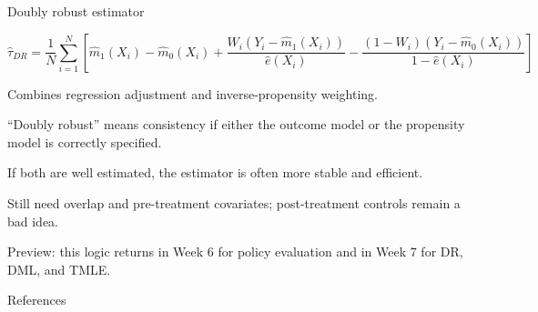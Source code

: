 \documentclass[xcolor={dvipsnames}, handout]{beamer}
\newcommand{\plscbibpath}{../assets/PLSC40601}
\renewcommand{\plscbibpath}{assets/PLSC40601}%
\begin{document}
\begin{frame}[shrink=10]{Doubly robust estimator}

\[
\widehat{\tau}_{DR}
=
\frac{1}{N}\sum_{i=1}^N
\left[
\widehat{m}_1(X_i)-\widehat{m}_0(X_i)
+
\frac{W_i\left(Y_i-\widehat{m}_1(X_i)\right)}{\widehat{e}(X_i)}
-
\frac{(1-W_i)\left(Y_i-\widehat{m}_0(X_i)\right)}{1-\widehat{e}(X_i)}
\right]
\]
\pause

\begin{wideitemize}
\item Combines regression adjustment and inverse-propensity weighting. \pause
\item ``Doubly robust'' means consistency if either the outcome model or the propensity model is correctly specified. \pause
\item If both are well estimated, the estimator is often more stable and efficient. \pause
\item Still need overlap and pre-treatment covariates; post-treatment controls remain a bad idea. \pause
\item Preview: this logic returns in Week 6 for policy evaluation and in Week 7 for DR, DML, and TMLE.
\end{wideitemize}

\end{frame}




\backupbegin

\begin{frame}[allowframebreaks]{References}
    
    
\end{frame}
\backupend
\end{document}
